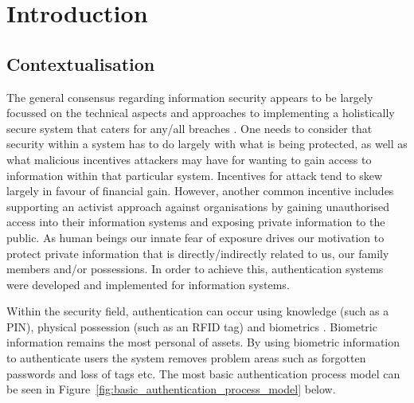 
\chapter{Introduction}  %

\ifpdf
    \graphicspath{{Chapter1/Figs/Raster/}{Chapter1/Figs/PDF/}{Chapter1/Figs/}}
\else
    \graphicspath{{Chapter1/Figs/Vector/}{Chapter1/Figs/}}
\fi


\section{Contextualisation} %

The general consensus regarding information security appears to be largely focussed on the technical aspects and approaches to implementing a holistically secure system that caters for any/all breaches \citep{Anderson2001}. One needs to consider that security within a system has to do largely with what is being protected, as well as what malicious incentives attackers may have for wanting to gain access to information within that particular system. Incentives for attack tend to skew largely in favour of financial gain. However, another common incentive includes supporting an activist approach against organisations by gaining unauthorised access into their information systems and exposing private information to the public. As human beings our innate fear of exposure drives our motivation to protect private information that is directly/indirectly related to us, our family members and/or possessions. In order to achieve this, authentication systems were developed and implemented for information systems. 

Within the security field, authentication can occur using knowledge (such as a PIN), physical possession (such as an RFID tag) and biometrics \citep{Liu2001}. Biometric information remains the most personal of assets. By using biometric information to authenticate users the system removes problem areas such as forgotten passwords and loss of tags etc. The most basic authentication process model can be seen in Figure~\ref{fig:basic_authentication_process_model} below.



